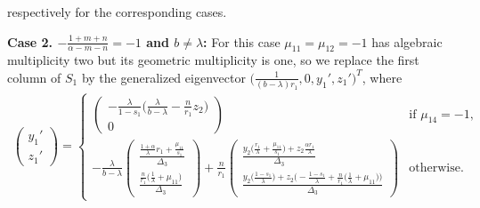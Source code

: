 \documentclass[usletter,11pt]{article}
\theoremstyle{remark}
\begin{document}
respectively for the corresponding cases.

{\bf Case 2. $-\frac{1+m+n}{\alpha-m-n}= -1$ and $b\ne\lambda$: }
For this case $\mu_{11} = \mu_{12} = -1$ has algebraic multiplicity two but its geometric multiplicity is one, so we replace the first column of $S_1$ by the generalized eigenvector 
$\big(\frac{1}{(b-\lambda)r_1}, 0, y_1', z_1'\big)^T$, where
\begin{equation} \label{eq:S1-2}
\begin{aligned}
\begin{pmatrix}
 y_1'\\z_1'
\end{pmatrix}
=\begin{cases}
  \begin{pmatrix}
  -\frac{\lambda}{1-s_1}\big(\frac{\lambda}{b-\lambda} -\frac{n}{r_1}z_2\big)\\0
  \end{pmatrix} & \text{if $\mu_{14}=-1$,}\\
  -\frac{\lambda}{b-\lambda}
  \begin{pmatrix}
  \frac{ \frac{1+\alpha}{\lambda}r_1 + \frac{\mu_{11}}{s_1} }{ \Delta_3 }\\
  \frac{ \frac{n}{r_1}\big(\frac{1}{\lambda} + \mu_{11}\big) }{ \Delta_3 }
  \end{pmatrix} +
  \frac{n}{r_1}
  \begin{pmatrix}
  \frac{ y_2\big(\frac{r_1}{\lambda} + \frac{\mu_{11}}{s_1}\big) + z_2\frac{\alpha r_1}{\lambda} }{ \Delta_3 }\\
  \frac{ y_2\big(\frac{1-s_1}{\lambda}\big) + z_2\big(-\frac{1-s_1}{\lambda}+\frac{n}{r_1}\big(\frac{1}{\lambda}+\mu_{11}\big)\big) }{ \Delta_3 }
  \end{pmatrix} & \text{otherwise.}
 \end{cases}
\end{aligned}
\end{equation}
\end{document}
